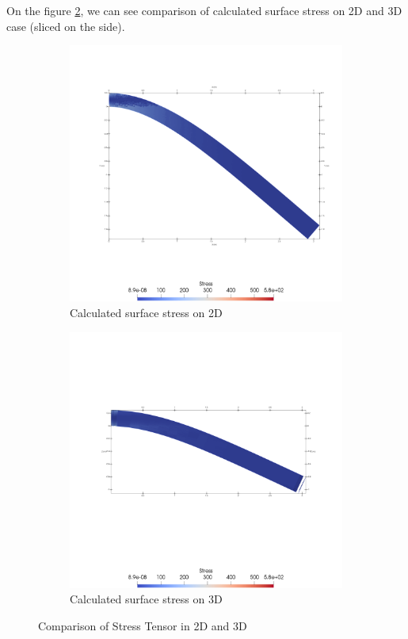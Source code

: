 \documentclass[a4paper,11pt]{article}
\begin{document}
\newpage
On the figure \ref{fig:comparison}, we can see comparison of calculated surface stress on 2D and 3D case (sliced on the side).
\begin{figure}[h!]
	\begin{subfigure}[b]{0.5\linewidth}
		\centering
		\includegraphics[width=\linewidth]{picture/conference/2dstress1}
		\caption{Calculated surface stress on 2D}
	\end{subfigure}
	\quad
	\begin{subfigure}[b]{0.5\linewidth}
		\centering
		\includegraphics[width=\linewidth]{picture/conference/3dstress1}
		\caption{Calculated surface stress on 3D}
		\label{}
	\end{subfigure}
	\caption{Comparison of Stress Tensor in 2D and 3D}
	\label{fig:comparison}
\end{figure}
\end{document}
